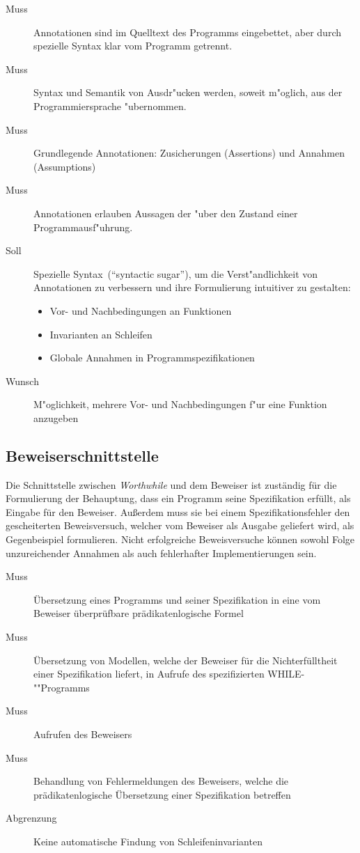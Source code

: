 \begin{description}%
    \item [Muss] Annotationen sind im Quelltext des Programms eingebettet, aber durch spezielle Syntax klar vom Programm getrennt.%
    \item [Muss] Syntax und Semantik von Ausdr"ucken werden, soweit m"oglich, aus der Programmiersprache "ubernommen.%
    \item [Muss] Grundlegende Annotationen: Zusicherungen (Assertions) und Annahmen (Assumptions)%
    \item [Muss] Annotationen erlauben Aussagen der  "uber den Zustand einer Programmausf"uhrung.%
    \item [Soll] Spezielle Syntax~("`syntactic sugar"'), um die Verst"andlichkeit von Annotationen zu verbessern und ihre Formulierung intuitiver zu gestalten:%
        \begin{itemize}%
            \item Vor- und Nachbedingungen an Funktionen%
            \item Invarianten an Schleifen%
            \item Globale Annahmen in Programmspezifikationen%
        \end{itemize}%
    \item [Wunsch] M"oglichkeit, mehrere Vor- und Nachbedingungen f"ur eine Funktion anzugeben%
\end{description}%

\subsection{Beweiserschnittstelle}%

Die Schnittstelle zwischen \textit{Worthwhile} und dem Beweiser ist zuständig für die Formulierung der Behauptung, dass ein Programm seine Spezifikation erfüllt, als Eingabe für den Beweiser. Außerdem muss sie bei einem Spezifikationsfehler den gescheiterten Beweisversuch, welcher vom Beweiser als Ausgabe geliefert wird, als Gegenbeispiel formulieren. Nicht erfolgreiche Beweisversuche können sowohl Folge unzureichender Annahmen als auch fehlerhafter Implementierungen sein.%

\begin{description}%
    \item [Muss] Übersetzung eines Programms und seiner Spezifikation in eine vom Beweiser überprüfbare prädikatenlogische Formel
    \item [Muss] Übersetzung von Modellen, welche der Beweiser für die Nichterfülltheit einer Spezifikation liefert, in Aufrufe des spezifizierten WHILE-""Programms%
    \item [Muss] Aufrufen des Beweisers
    \item [Muss] Behandlung von Fehlermeldungen des Beweisers, welche die prädikatenlogische Übersetzung einer Spezifikation betreffen%
    \item [Abgrenzung] Keine automatische Findung von Schleifeninvarianten
\end{description}%

